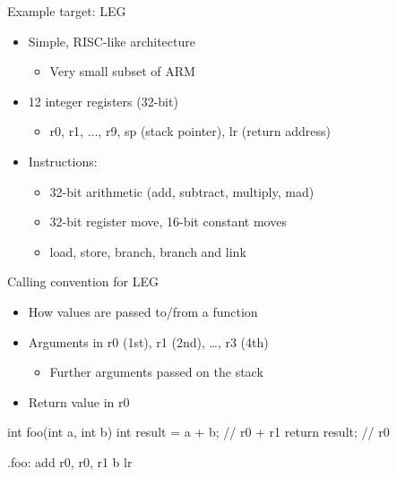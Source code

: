 
\begin{frame}{Example target: LEG}

\begin{itemize}
    \item Simple, RISC-like architecture
    \begin{itemize}
        \item Very small subset of ARM
    \end{itemize}
    \item 12 integer registers (32-bit)
    \begin{itemize}
        \item r0, r1, ..., r9, sp (stack pointer), lr (return address)
    \end{itemize}
    \item Instructions:
    \begin{itemize}
        \item 32-bit arithmetic (add, subtract, multiply, mad)
        \item 32-bit register move, 16-bit constant moves
        \item load, store, branch, branch and link
    \end{itemize}
\end{itemize}

\end{frame}


\begin{frame}[fragile]{Calling convention for LEG}

\begin{itemize}
    \item How values are passed to/from a function
    \item Arguments in r0 (1st), r1 (2nd), …, r3 (4th)
    \begin{itemize}
        \item Further arguments passed on the stack
    \end{itemize}
    \item Return value in r0
\end{itemize}

\begin{codebox}
int foo(int a, int b) {
    int result = a + b;   // r0 + r1
    return result;        // r0
}
\end{codebox}

\begin{codebox}
.foo:
    add r0, r0, r1
    b lr
\end{codebox}

\end{frame}

